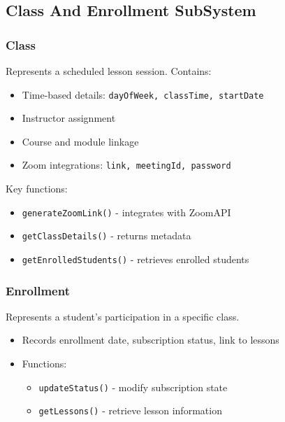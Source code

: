 \subsection{Class And Enrollment SubSystem}

\subsubsection{Class}
Represents a scheduled lesson session. Contains:
\begin{itemize}
    \item Time-based details: \texttt{dayOfWeek, classTime, startDate}
    \item Instructor assignment
    \item Course and module linkage
    \item Zoom integrations: \texttt{link, meetingId, password}
\end{itemize}
Key functions:
\begin{itemize}
    \item \texttt{generateZoomLink()} - integrates with ZoomAPI
    \item \texttt{getClassDetails()} - returns metadata
    \item \texttt{getEnrolledStudents()} - retrieves enrolled students
\end{itemize}

\subsubsection{Enrollment}
Represents a student’s participation in a specific class.
\begin{itemize}
    \item Records enrollment date, subscription status, link to lessons
    \item Functions:
    \begin{itemize}
        \item \texttt{updateStatus()} - modify subscription state
        \item \texttt{getLessons()} - retrieve lesson information
    \end{itemize}
\end{itemize}

